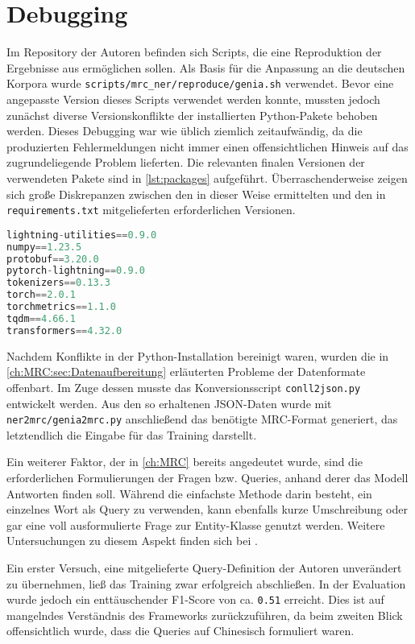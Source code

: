 \section{Debugging}
\label{ch:Training:sec:Debugging}

Im Repository der Autoren befinden sich Scripts, die eine Reproduktion der Ergebnisse aus \cite{li2019unified} ermöglichen sollen. Als Basis für die Anpassung an die deutschen Korpora wurde \verb|scripts/mrc_ner/reproduce/genia.sh| verwendet. Bevor eine angepasste Version dieses Scripts verwendet werden konnte, mussten jedoch zunächst diverse Versionskonflikte der installierten Python-Pakete behoben werden. Dieses Debugging war wie üblich ziemlich zeitaufwändig, da die produzierten Fehlermeldungen nicht immer einen offensichtlichen Hinweis auf das zugrundeliegende Problem lieferten. Die relevanten finalen Versionen der verwendeten Pakete sind in \autoref{lst:packages} aufgeführt. Überraschenderweise zeigen sich große Diskrepanzen zwischen den in dieser Weise ermittelten und den in \verb|requirements.txt| mitgelieferten erforderlichen Versionen.

\begin{lstlisting}[caption={Liste der verwendeten Pakete}, language={Python}, label={lst:packages}]
lightning-utilities==0.9.0
numpy==1.23.5
protobuf==3.20.0
pytorch-lightning==0.9.0
tokenizers==0.13.3
torch==2.0.1
torchmetrics==1.1.0
tqdm==4.66.1
transformers==4.32.0
\end{lstlisting}

Nachdem Konflikte in der Python-Installation bereinigt waren, wurden die in \autoref{ch:MRC:sec:Datenaufbereitung} erläuterten Probleme der Datenformate offenbart. Im Zuge dessen musste das Konversionsscript \verb|conll2json.py| entwickelt werden. Aus den so erhaltenen JSON-Daten wurde mit \verb|ner2mrc/genia2mrc.py| anschließend das benötigte MRC-Format generiert, das letztendlich die Eingabe für das Training darstellt.

Ein weiterer Faktor, der in \autoref{ch:MRC} bereits angedeutet wurde, sind die erforderlichen Formulierungen der Fragen bzw. Queries, anhand derer das Modell Antworten finden soll. Während die einfachste Methode darin besteht, ein einzelnes Wort als Query zu verwenden, kann ebenfalls kurze Umschreibung oder gar eine voll ausformulierte Frage zur Entity-Klasse genutzt werden. Weitere Untersuchungen zu diesem Aspekt finden sich bei \cite[7]{li2019unified}.

Ein erster Versuch, eine mitgelieferte Query-Definition der Autoren unverändert zu übernehmen, ließ das Training zwar erfolgreich abschließen. In der Evaluation wurde jedoch ein enttäuschender F1-Score von ca. \verb|0.51| erreicht. Dies ist auf mangelndes Verständnis des Frameworks zurückzuführen, da beim zweiten Blick offensichtlich wurde, dass die Queries auf Chinesisch formuliert waren.

